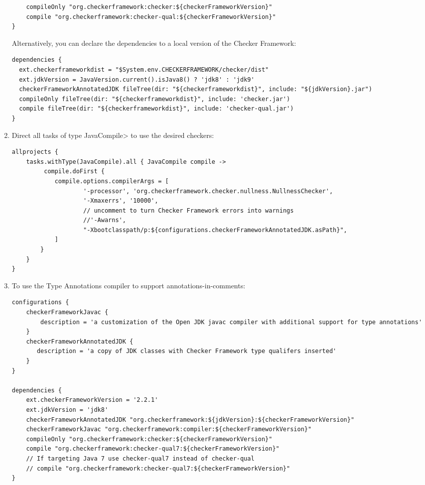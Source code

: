 \begin{enumerate}
\begin{Verbatim}
    compileOnly "org.checkerframework:checker:${checkerFrameworkVersion}"
    compile "org.checkerframework:checker-qual:${checkerFrameworkVersion}"
}
\end{Verbatim}

Alternatively, you can declare the dependencies to a local version of the Checker Framework:

\begin{Verbatim}
dependencies {
  ext.checkerframeworkdist = "$System.env.CHECKERFRAMEWORK/checker/dist"
  ext.jdkVersion = JavaVersion.current().isJava8() ? 'jdk8' : 'jdk9'
  checkerFrameworkAnnotatedJDK fileTree(dir: "${checkerframeworkdist}", include: "${jdkVersion}.jar")
  compileOnly fileTree(dir: "${checkerframeworkdist}", include: 'checker.jar')
  compile fileTree(dir: "${checkerframeworkdist}", include: 'checker-qual.jar')
}
\end{Verbatim}

\item Direct all tasks of type \<JavaCompile> to use the desired checkers:

\begin{mysmall}
\begin{Verbatim}
allprojects {
    tasks.withType(JavaCompile).all { JavaCompile compile ->
         compile.doFirst {
            compile.options.compilerArgs = [
                    '-processor', 'org.checkerframework.checker.nullness.NullnessChecker',
                    '-Xmaxerrs', '10000',
                    // uncomment to turn Checker Framework errors into warnings
                    //'-Awarns',
                    "-Xbootclasspath/p:${configurations.checkerFrameworkAnnotatedJDK.asPath}",
            ]
        }
    }
}
\end{Verbatim}
\end{mysmall}

\item To use the Type Annotations compiler to support annotations-in-comments:

\begin{mysmall}
\begin{Verbatim}
configurations {
    checkerFrameworkJavac {
        description = 'a customization of the Open JDK javac compiler with additional support for type annotations'
    }
    checkerFrameworkAnnotatedJDK {
       description = 'a copy of JDK classes with Checker Framework type qualifers inserted'
    }
}

dependencies {
    ext.checkerFrameworkVersion = '2.2.1'
    ext.jdkVersion = 'jdk8'
    checkerFrameworkAnnotatedJDK "org.checkerframework:${jdkVersion}:${checkerFrameworkVersion}"
    checkerFrameworkJavac "org.checkerframework:compiler:${checkerFrameworkVersion}"
    compileOnly "org.checkerframework:checker:${checkerFrameworkVersion}"
    compile "org.checkerframework:checker-qual7:${checkerFrameworkVersion}"
    // If targeting Java 7 use checker-qual7 instead of checker-qual
    // compile "org.checkerframework:checker-qual7:${checkerFrameworkVersion}"
}


\end{Verbatim}
\end{mysmall}
\end{enumerate}

